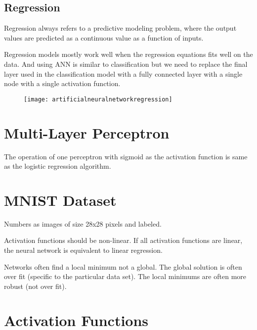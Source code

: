 	\subsection{Regression}
	\begin{bulletedlist}
		\item Regression always refers to a predictive modeling problem, where the output values are predicted as a continuous value as a function of inputs.
		\item Regression models mostly work well when the regression equations fits well on the data.  And using ANN is similar to classification but we need to replace the final layer used in the classification model with a fully connected layer with a single node with a single activation function.
	\end{bulletedlist}
 	\begin{figure}[h]
		\centering
		\texttt{[image: artificialneuralnetworkregression]}
		\caption{}
		\label{fig:artificialneuralnetworkregression}
	\end{figure}

	\section{Multi-Layer Perceptron}

	\begin{bulletedlist}
		\item The operation of one perceptron with sigmoid as the activation function is same as the logistic regression algorithm.
	\end{bulletedlist}

	\section{MNIST Dataset}
	\begin{bulletedlist}
		\item Numbers as images of size 28x28 pixels and labeled.
		\item Activation functions should be non-linear.  If all activation functions are linear, the neural network is equivalent to linear regression.
		\item Networks often find a local minimum not a global.  The global solution is often over fit (specific to the particular data set).  The local minimums are often more robust (not over fit).
	\end{bulletedlist}


	\section{Activation Functions}

